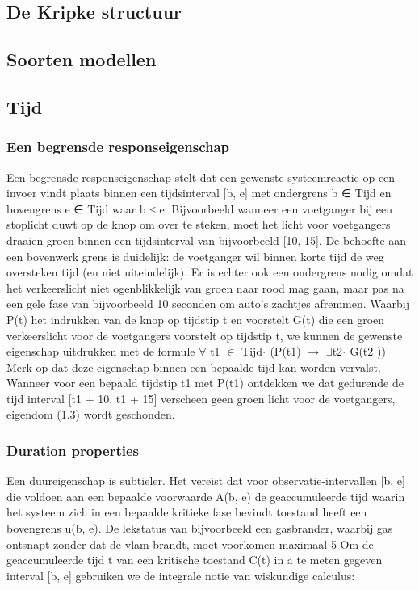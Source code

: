 \documentclass{article}
\begin{document}
	
	\subsection{De Kripke structuur}
	
	\subsection{Soorten modellen}
	
	\subsection{Tijd}
	\subsubsection{Een begrensde responseigenschap}
	Een begrensde responseigenschap stelt dat
	een gewenste systeemreactie op een invoer vindt plaats binnen een tijdsinterval
	[b, e] met ondergrens b ∈ Tijd en bovengrens e ∈ Tijd waar
	b ≤ e. Bijvoorbeeld wanneer een voetganger bij een stoplicht duwt
	op de knop om over te steken, moet het licht voor voetgangers draaien
	groen binnen een tijdsinterval van bijvoorbeeld [10, 15]. De behoefte aan een bovenwerk
	grens is duidelijk: de voetganger wil binnen korte tijd de weg oversteken
	tijd (en niet uiteindelijk). Er is echter ook een ondergrens nodig
	omdat het verkeerslicht niet ogenblikkelijk van groen naar rood mag gaan, maar pas na een gele fase van bijvoorbeeld 10 seconden om
	auto's zachtjes afremmen.
	Waarbij P(t) het indrukken van de knop op tijdstip t en voorstelt
	G(t) die een groen verkeerslicht voor de voetgangers voorstelt op tijdstip t,
	we kunnen de gewenste eigenschap uitdrukken met de formule
	$\forall$ t1 $\in$ Tijd $\dot{}$ (P(t1) $\rightarrow$ $\exists$t2 \in [t1 + 10, t1 + 15] $\dot{}$ G(t2 ))
	Merk op dat deze eigenschap binnen een bepaalde tijd kan worden vervalst. Wanneer
	voor een bepaald tijdstip t1 met P(t1) ontdekken we dat gedurende de tijd
	interval [t1 + 10, t1 + 15] verscheen geen groen licht voor de voetgangers,
	eigendom (1.3) wordt geschonden.
	\subsubsection{Duration properties}
	
	Een duureigenschap is subtieler. Het vereist dat
	voor observatie-intervallen [b, e] die voldoen aan een bepaalde voorwaarde A(b, e)
	de geaccumuleerde tijd waarin het systeem zich in een bepaalde kritieke fase bevindt
	toestand heeft een bovengrens u(b, e). De lekstatus van bijvoorbeeld een
	gasbrander, waarbij gas ontsnapt zonder dat de vlam brandt, moet voorkomen
	maximaal 5%
	Om de geaccumuleerde tijd t van een kritische toestand C(t) in a te meten
	gegeven interval [b, e] gebruiken we de integrale notie van wiskundige calculus:
	
\end{document}

